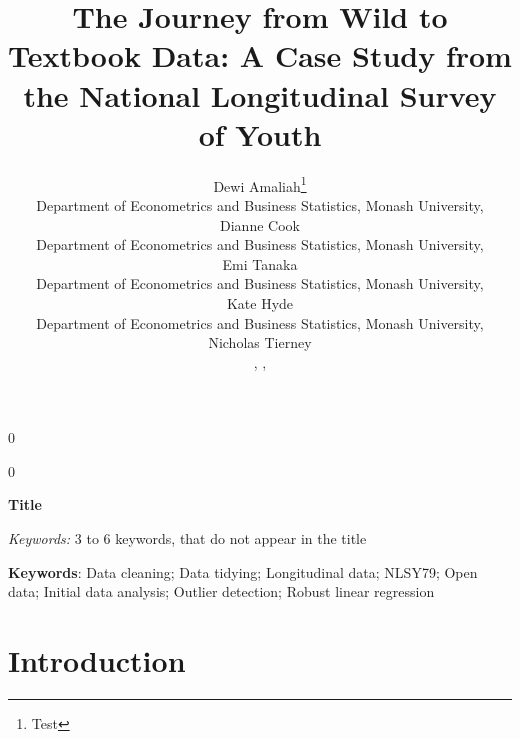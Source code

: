 \documentclass[12pt]{article}
\newcommand{\blind}{0}
\def\spacingset#1{\renewcommand{\baselinestretch}%
{#1}\small\normalsize} \spacingset{1}
\begin{document}
%

\def\spacingset#1{\renewcommand{\baselinestretch}%
{#1}\small\normalsize} \spacingset{1}



\blind
{
  \title{\bf The Journey from Wild to Textbook Data: A Case Study from the National Longitudinal Survey of Youth}
  \author{
            Dewi Amaliah\thanks{Test}\\
      Department of Econometrics and Business Statistics, Monash University, \\
            Dianne Cook\\
      Department of Econometrics and Business Statistics, Monash University, \\
            Emi Tanaka\\
      Department of Econometrics and Business Statistics, Monash University, \\
            Kate Hyde\\
      Department of Econometrics and Business Statistics, Monash University, \\
            Nicholas Tierney\\
      , , }
        \maketitle
} \fi

\blind
{
  \bigskip
  \bigskip
  \bigskip
  \begin{center}
    {\LARGE\bf Title}
\end{center}
  \medskip
} \fi

\bigskip
\begin{abstract}

\end{abstract}

\noindent%
{\it Keywords:}  3 to 6 keywords, that do not appear in the title
\vfill

\newpage
\spacingset{1.45} %

\textbf{Keywords}: Data cleaning; Data tidying; Longitudinal data; NLSY79; Open data; Initial data analysis; Outlier detection; Robust linear regression

\hypertarget{intro}{%
\section{Introduction}\label{intro}}
\end{document}
